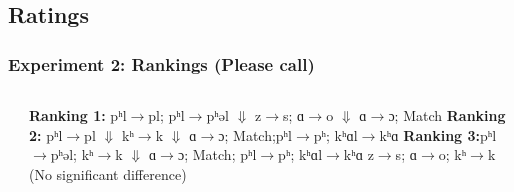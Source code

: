 \documentclass{beamer}
\begin{document}
\subsection{Ratings}
\begin{frame}[shrink=30]
\frametitle{Experiment 2:  Rankings (Please call)}
\begin{columns}
   \begin{center}

\end{center}
\begin{center}
\textbf{Ranking 1:} \linebreak  \linebreak 
pʰl$\rightarrow$pl; pʰl$\rightarrow$pʰəl   \linebreak
$\Downarrow$ \linebreak
 z$\rightarrow$s; ɑ$\rightarrow$o  \linebreak
$\Downarrow$ \linebreak
ɑ$\rightarrow$ɔ; Match \linebreak\linebreak
\textbf{Ranking 2:}\linebreak \linebreak
pʰl$\rightarrow$pl \linebreak 
$\Downarrow$\linebreak 
kʰ$\rightarrow$k \linebreak
$\Downarrow$\linebreak 
ɑ$\rightarrow$ɔ; Match;pʰl$\rightarrow$pʰ; kʰɑl$\rightarrow$kʰɑ \linebreak\linebreak
\textbf{Ranking 3:}\linebreak \linebreak pʰl$\rightarrow$pʰəl; kʰ$\rightarrow$k \linebreak
$\Downarrow$\linebreak 
ɑ$\rightarrow$ɔ; Match; pʰl$\rightarrow$pʰ; kʰɑl$\rightarrow$kʰɑ\linebreak\linebreak
z$\rightarrow$s; ɑ$\rightarrow$o; kʰ$\rightarrow$k (No significant difference)
\end{center}
\end{columns}
\end{frame}
\end{document}
